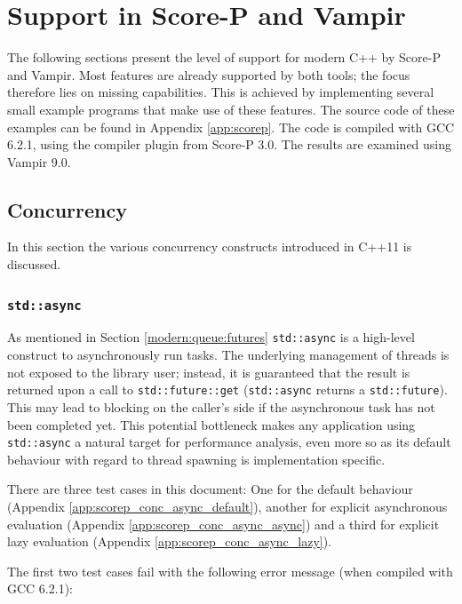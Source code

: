 \section{Support in Score-P and Vampir}

The following sections present the level of support for modern C++ by Score-P and Vampir. Most features are already supported by both tools; the focus therefore lies on missing capabilities. This is achieved by implementing several small example programs that make use of these features. The source code of these examples can be found in Appendix \ref{app:scorep}. The code is compiled with GCC 6.2.1, using the compiler plugin from Score-P 3.0. The results are examined using Vampir 9.0.

\subsection{Concurrency}\label{scorep:conc}

In this section the various concurrency constructs introduced in C++11 is discussed.

\subsubsection{\texttt{std::async}}\label{scorep:conc:async}

As mentioned in Section \ref{modern:queue:futures} \texttt{std::async} is a high-level construct to asynchronously run tasks. The underlying management of threads is not exposed to the library user; instead, it is guaranteed that the result is returned upon a call to \texttt{std::future::get} (\texttt{std::async} returns a \texttt{std::future}). This may lead to blocking on the caller's side if the asynchronous task has not been completed yet. This potential bottleneck makes any application using \texttt{std::async} a natural target for performance analysis, even more so as its default behaviour with regard to thread spawning is implementation specific.

There are three test cases in this document: One for the default behaviour (Appendix \ref{app:scorep_conc_async_default}), another for explicit asynchronous evaluation (Appendix \ref{app:scorep_conc_async_async}) and a third for explicit lazy evaluation (Appendix \ref{app:scorep_conc_async_lazy}).

The first two test cases fail with the following error message (when compiled with GCC 6.2.1):

